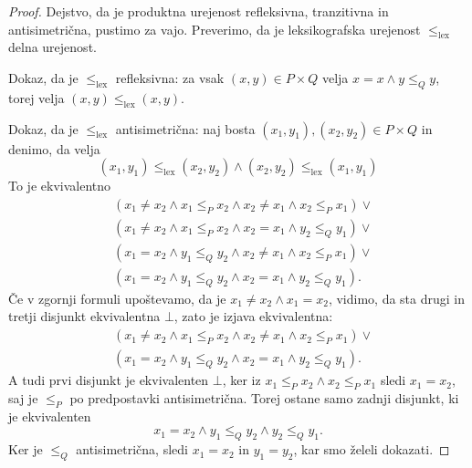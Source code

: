 \begin{proof}
  Dejstvo, da je produktna urejenost refleksivna, tranzitivna in antisimetrična, pustimo za vajo. Preverimo, da je leksikografska urejenost $\leq_\mathrm{lex}$ delna urejenost.

  Dokaz, da je $\leq_\mathrm{lex}$ refleksivna: za vsak $(x, y) \in P \times Q$ velja $x = x \land y \leq_Q y$, torej velja $(x, y) \leq_\mathrm{lex} (x, y)$.

  Dokaz, da je $\leq_\mathrm{lex}$ antisimetrična: naj bosta $(x_1,y_1), (x_2,y_2) \in P \times Q$ in denimo, da velja
  \begin{equation*}
    (x_1, y_1) \leq_\mathrm{lex} (x_2, y_2) \land (x_2, y_2) \leq_\mathrm{lex} (x_1, y_1)
  \end{equation*}
  To je ekvivalentno
  \begin{align*}
  & (x_1 \neq x_2 \land x_1 \leq_P x_2 \land x_2 \neq x_1 \land x_2 \leq_P x_1) \lor {}\\
  & (x_1 \neq x_2 \land x_1 \leq_P x_2 \land x_2 = x_1 \land y_2 \leq_Q y_1) \lor {}\\
  & (x_1 = x_2 \land y_1 \leq_Q y_2 \land x_2 \neq x_1 \land x_2 \leq_P x_1) \lor {}\\
  & (x_1 = x_2 \land y_1 \leq_Q y_2 \land x_2 = x_1 \land y_2 \leq_Q y_1).
  \end{align*}
  Če v zgornji formuli upoštevamo, da je $x_1 \neq x_2 \land x_1 = x_2$, vidimo, da sta drugi in tretji disjunkt ekvivalentna $\bot$, zato
  je izjava ekvivalentna:
  \begin{align*}
  &(x_1 \neq x_2 \land x_1 \leq_P x_2 \land x_2 \neq x_1 \land x_2 \leq_P x_1) \lor {}\\
  &(x_1 = x_2 \land y_1 \leq_Q y_2 \land x_2 = x_1 \land y_2 \leq_Q y_1).
  \end{align*}
  A tudi prvi disjunkt je ekvivalenten $\bot$, ker iz $x_1 \leq_P x_2 \land x_2 \leq_P x_1$ sledi $x_1 = x_2$, saj je $\leq_P$ po predpostavki antisimetrična. Torej ostane samo zadnji disjunkt, ki je ekvivalenten
  \begin{equation*}
    x_1 = x_2 \land y_1 \leq_Q y_2 \land y_2 \leq_Q y_1.
  \end{equation*}
  Ker je $\leq_Q$ antisimetrična, sledi $x_1 = x_2$ in $y_1 = y_2$, kar smo želeli dokazati.


\end{proof}
